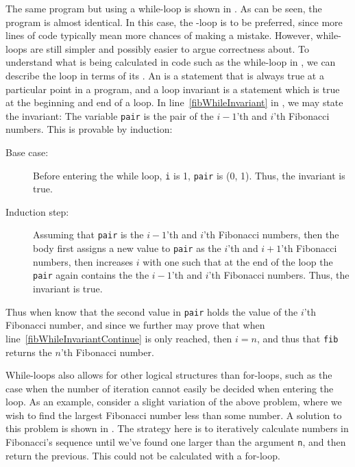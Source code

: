 The same program but using a while-loop is shown in .
%
%
As can be seen, the program is almost identical. In this case, the -loop is to be preferred, since more lines of code typically mean more chances of making a mistake.  However, while-loops are still simpler and possibly easier to argue correctness about. To understand what is being calculated in code such as the while-loop in , we can describe the loop in terms of its . An  is a statement that is always true at a particular point in a program, and a loop invariant is a statement which is true at the beginning and end of a loop. In line~\ref{fibWhileInvariant} in , we may state the invariant: The variable \lstinline{pair} is the pair of the $i-1$'th and $i$'th Fibonacci numbers. This is provable by induction:
\begin{description}
\item[Base case:]  Before entering the while loop, \lstinline{i} is 1, \lstinline{pair} is (0, 1). Thus, the invariant is true.
\item[Induction step:] Assuming that \lstinline{pair} is the $i-1$'th and $i$'th Fibonacci numbers, then the body first assigns a new value to \lstinline{pair} as the $i$'th and $i+1$'th Fibonacci numbers, then increases $i$ with one such that at the end of the loop the \lstinline{pair} again contains the the $i-1$'th and $i$'th Fibonacci numbers. Thus, the invariant is true.
\end{description}
Thus when know that the second value in \lstinline{pair} holds the value of the $i$'th Fibonacci number, and since we further may prove that when line~\ref{fibWhileInvariantContinue} is only reached, then $i = n$, and thus that \lstinline{fib} returns the $n$'th Fibonacci number. 

While-loops also allows for other logical structures than for-loops, such as the case when the number of iteration cannot easily be decided when entering the loop. As an example, consider a slight variation of the above problem, where we wish to find the largest Fibonacci number less than some number. A solution to this problem is shown in .
%
%
The strategy here is to iteratively calculate numbers in Fibonacci's sequence until we've found one larger than the argument \lstinline{n}, and then return the previous. This could not be calculated with a for-loop.

